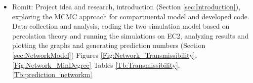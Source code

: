 \documentclass[10pt, journal,onecolumn]{IEEEtran}
\begin{document}
\begin{appendix}
\begin{itemize}
\item {Romit: } Project idea and research, introduction (Section \ref{sec:Introduction}), exploring the MCMC approach for compartmental model  and developed code.
Data collection and analysis, coding the two simulation model based on percolation theory and running the simulations on EC2, analyzing results and plotting the graphs and generating prediction numbers (Section \ref{sec:NetworkModel})
Figures \ref{Fig:Network_Transmissibility}, \ref{Fig:Network_MinDegree}
Tables \ref{Tb:Transmissibility}, \ref{Tb:prediction_networkm}
\end{itemize}
\end{appendix}
\end{document}
